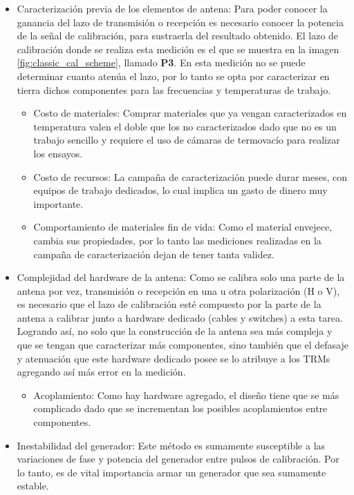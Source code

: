 \begin{itemize}
	\item Caracterización previa de los elementos de antena: Para poder conocer la ganancia del lazo de transmisión o recepción
es necesario conocer la potencia de la señal de calibración, para sustraerla del resultado obtenido. El lazo de calibración 
donde se realiza esta medición es el que se muestra en la imagen \ref{fig:classic_cal_scheme}, llamado \textbf{P3}. En esta 
medición no se puede determinar cuanto atenúa el lazo, por lo tanto se opta por caracterizar en tierra dichos componentes 
para las frecuencias y temperaturas de trabajo. 
	\begin{itemize}
		\item Costo de materiales: Comprar materiales que ya vengan caracterizados en temperatura valen el doble que los no 
			caracterizados dado que no es un trabajo sencillo y requiere el uso de cámaras de termovacío para realizar los ensayos.
		\item Costo de recursos: La campaña de caracterización puede durar meses, con equipos de trabajo dedicados, lo cual implica
			un gasto de dinero muy importante. 
		\item Comportamiento de materiales fin de vida: Como el material envejece, cambia sus propiedades, por lo tanto las mediciones realizadas 
			en la campaña de caracterización dejan de tener tanta validez.
	\end{itemize}
	\item Complejidad del hardware de la antena: Como se calibra solo una parte de la antena por vez, transmisión o recepción en 
		una u otra polarización (H o V), es necesario que el lazo de calibración esté compuesto por la parte de la antena a 
		calibrar junto a hardware dedicado (cables y switches) a esta tarea. Logrando así, no solo que la construcción de la antena 
		sea más compleja y que se tengan que caracterizar más componentes, sino también que el defasaje y atenuación que este 
		hardware dedicado posee se lo atribuye a los TRMs agregando así más error en la medición. 
	\begin{itemize}
		\item Acoplamiento: Como hay hardware agregado, el diseño tiene que se más complicado dado que se incrementan los posibles 
			acoplamientos entre componentes.
	\end{itemize}
	\item Inestabilidad del generador: Este método es sumamente susceptible a las variaciones de fase y potencia del generador 
		entre pulsos de calibración. Por lo tanto, es de vital importancia armar un generador que sea sumamente estable.

\end{itemize}
